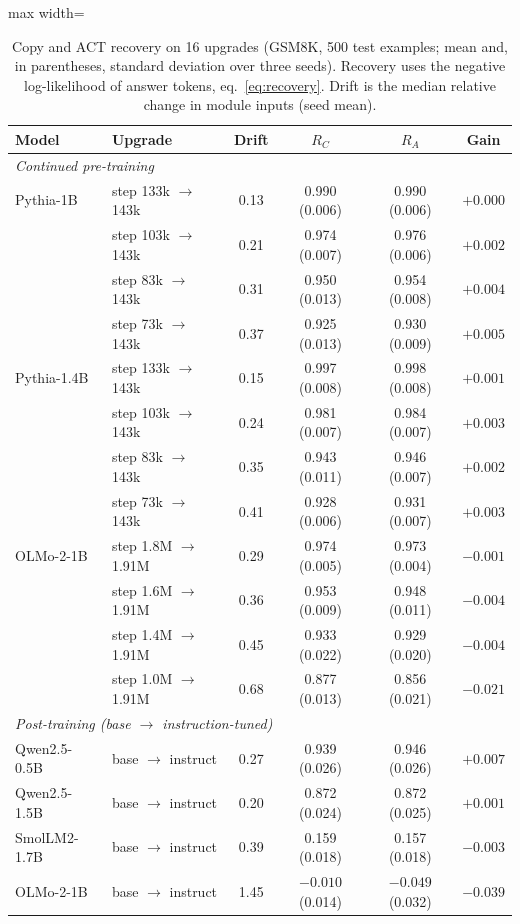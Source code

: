 \documentclass[preprint,12pt,authoryear]{elsarticle}
\begin{document}
\begin{table}[t]
\centering
\caption{Copy and ACT recovery on 16 upgrades (GSM8K, 500 test examples; mean and, in parentheses, standard deviation over three seeds). Recovery uses the negative log-likelihood of answer tokens, eq.~\eqref{eq:recovery}. Drift is the median relative change in module inputs (seed mean).}\label{tab:pairs}
\small
\begin{adjustbox}{max width=\textwidth}
\begin{tabular}{llcccc}
\toprule
Model & Upgrade & Drift & $R_C$ & $R_A$ & Gain\\
\midrule
\multicolumn{6}{l}{\emph{Continued pre-training}}\\
Pythia-1B & step 133k $\to$ 143k & 0.13 & 0.990 (0.006) & 0.990 (0.006) & $+0.000$\\
 & step 103k $\to$ 143k & 0.21 & 0.974 (0.007) & 0.976 (0.006) & $+0.002$\\
 & step 83k $\to$ 143k & 0.31 & 0.950 (0.013) & 0.954 (0.008) & $+0.004$\\
 & step 73k $\to$ 143k & 0.37 & 0.925 (0.013) & 0.930 (0.009) & $+0.005$\\
Pythia-1.4B & step 133k $\to$ 143k & 0.15 & 0.997 (0.008) & 0.998 (0.008) & $+0.001$\\
 & step 103k $\to$ 143k & 0.24 & 0.981 (0.007) & 0.984 (0.007) & $+0.003$\\
 & step 83k $\to$ 143k & 0.35 & 0.943 (0.011) & 0.946 (0.007) & $+0.002$\\
 & step 73k $\to$ 143k & 0.41 & 0.928 (0.006) & 0.931 (0.007) & $+0.003$\\
OLMo-2-1B & step 1.8M $\to$ 1.91M & 0.29 & 0.974 (0.005) & 0.973 (0.004) & $-0.001$\\
 & step 1.6M $\to$ 1.91M & 0.36 & 0.953 (0.009) & 0.948 (0.011) & $-0.004$\\
 & step 1.4M $\to$ 1.91M & 0.45 & 0.933 (0.022) & 0.929 (0.020) & $-0.004$\\
 & step 1.0M $\to$ 1.91M & 0.68 & 0.877 (0.013) & 0.856 (0.021) & $-0.021$\\
\multicolumn{6}{l}{\emph{Post-training (base $\to$ instruction-tuned)}}\\
Qwen2.5-0.5B & base $\to$ instruct & 0.27 & 0.939 (0.026) & 0.946 (0.026) & $+0.007$\\
Qwen2.5-1.5B & base $\to$ instruct & 0.20 & 0.872 (0.024) & 0.872 (0.025) & $+0.001$\\
SmolLM2-1.7B & base $\to$ instruct & 0.39 & 0.159 (0.018) & 0.157 (0.018) & $-0.003$\\
OLMo-2-1B & base $\to$ instruct & 1.45 & $-0.010$ (0.014) & $-0.049$ (0.032) & $-0.039$\\
\bottomrule
\end{tabular}
\end{adjustbox}
\end{table}
\end{document}
